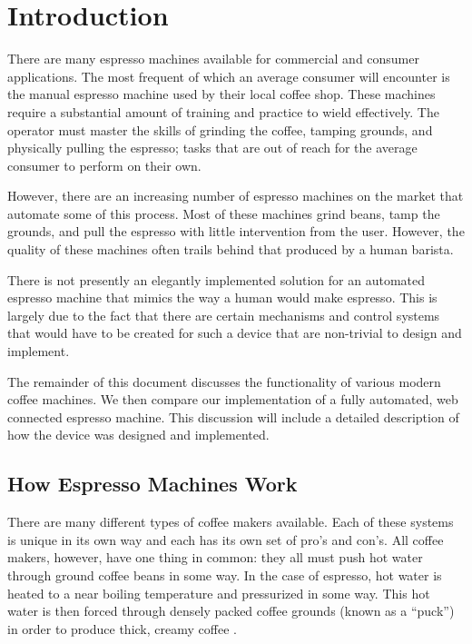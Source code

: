 \documentclass[conference]{IEEEtran}
\begin{document}
%
\section{Introduction} 

There are many espresso machines available for commercial and
consumer applications. The most frequent of which an average consumer will
encounter is the manual espresso machine used by their local coffee shop. These
machines require a substantial amount of training and practice to wield
effectively. The operator must master the skills of grinding the coffee, tamping
grounds, and physically pulling the espresso; tasks that are out of reach for
the average consumer to perform on their own.

However, there are an increasing number of espresso machines on the market that
automate some of this process.  Most of these machines grind beans, tamp the
grounds, and pull the espresso with little intervention from the user. However,
the quality of these machines often trails behind that produced by a human
barista.
 
There is not presently an elegantly implemented solution for an
automated espresso machine that mimics the way a human would make espresso. This
is largely due to the fact that there are certain mechanisms and control 
systems that would have to be created for such a device that are non-trivial to design and implement.

The remainder of this document discusses the functionality of various 
modern coffee machines. We then compare our implementation of a fully
automated, web connected espresso machine. This discussion will include a
detailed description of how the device was designed and implemented.

\subsection{How Espresso Machines Work}

There are many different types of coffee makers available. Each of these systems
is unique in its own way and each has its own set of pro's and con's. All coffee makers,
however, have one thing in common: they all must push hot water through ground
coffee beans in some way. In the case of espresso, hot water is heated to a near
boiling temperature and pressurized in some way. This hot water is then forced
through densely packed coffee grounds (known as a ``puck'') in order to produce
thick, creamy coffee \cite{wikiespresso}.   
\end{document}
